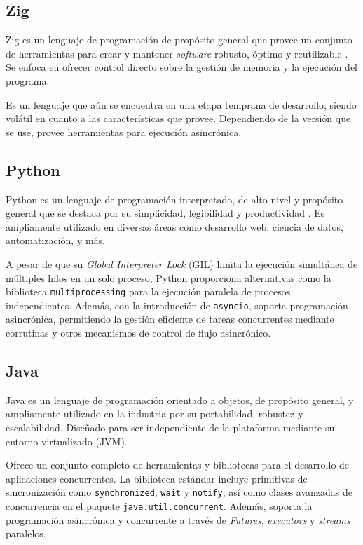 \documentclass[11pt]{article}
\let\Oldsubsection\subsection
\renewcommand{\subsection}{\FloatBarrier\Oldsubsection}
\newcommand{\english}[1]{\textit{#1}}
\begin{document}
\subsection{Zig}

Zig es un lenguaje de programación de propósito general que provee un conjunto de herramientas para crear y mantener \english{software} robusto, óptimo y reutilizable \cite{com:zig}. Se enfoca en ofrecer control directo sobre la gestión de memoria y la ejecución del programa.

Es un lenguaje que aún se encuentra en una etapa temprana de desarrollo, siendo volátil en cuanto a las características que provee. Dependiendo de la versión que se use, provee herramientas para ejecución asincrónica.

\subsection{Python}

Python es un lenguaje de programación interpretado, de alto nivel y propósito general que se destaca por su simplicidad, legibilidad y productividad \cite{com:python}. Es ampliamente utilizado en diversas áreas como desarrollo web, ciencia de datos, automatización, y más.

A pesar de que su \english{Global Interpreter Lock} (GIL) limita la ejecución simultánea de múltiples hilos en un solo proceso, Python proporciona alternativas como la biblioteca \lstinline{multiprocessing} para la ejecución paralela de procesos independientes. Además, con la introducción de \lstinline{asyncio}, soporta programación asincrónica, permitiendo la gestión eficiente de tareas concurrentes mediante corrutinas y otros mecanismos de control de flujo asincrónico.

\subsection{Java}

Java es un lenguaje de programación orientado a objetos, de propósito general, y ampliamente utilizado en la industria por su portabilidad, robustez y escalabilidad. Diseñado para ser independiente de la plataforma mediante su entorno virtualizado (JVM).

Ofrece un conjunto completo de herramientas y bibliotecas para el desarrollo de aplicaciones concurrentes. La biblioteca estándar incluye primitivas de sincronización como \lstinline{synchronized}, \lstinline{wait} y \lstinline{notify}, así como clases avanzadas de concurrencia en el paquete \lstinline{java.util.concurrent}. Además, soporta la programación asincrónica y concurrente a través de \english{Futures}, \english{executors} y \english{streams} paralelos.
\end{document}

